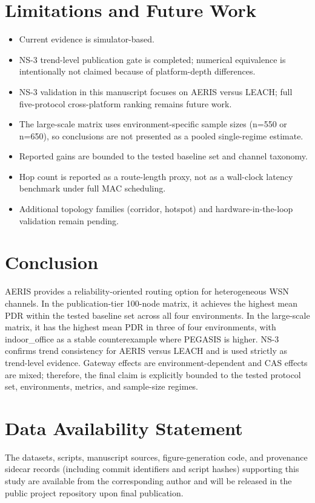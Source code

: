 ﻿\documentclass[sensors,article,submit,moreauthors,pdftex]{Definitions/mdpi}
\begin{document}
\section{Limitations and Future Work}
\begin{itemize}
\item Current evidence is simulator-based.
\item NS-3 trend-level publication gate is completed; numerical equivalence is intentionally not claimed because of platform-depth differences.
\item NS-3 validation in this manuscript focuses on AERIS versus LEACH; full five-protocol cross-platform ranking remains future work.
\item The large-scale matrix uses environment-specific sample sizes (n=550 or n=650), so conclusions are not presented as a pooled single-regime estimate.
\item Reported gains are bounded to the tested baseline set and channel taxonomy.
\item Hop count is reported as a route-length proxy, not as a wall-clock latency benchmark under full MAC scheduling.
\item Additional topology families (corridor, hotspot) and hardware-in-the-loop validation remain pending.
\end{itemize}

\section{Conclusion}
AERIS provides a reliability-oriented routing option for heterogeneous WSN channels. In the publication-tier 100-node matrix, it achieves the highest mean PDR within the tested baseline set across all four environments. In the large-scale matrix, it has the highest mean PDR in three of four environments, with indoor\_office as a stable counterexample where PEGASIS is higher. NS-3 confirms trend consistency for AERIS versus LEACH and is used strictly as trend-level evidence. Gateway effects are environment-dependent and CAS effects are mixed; therefore, the final claim is explicitly bounded to the tested protocol set, environments, metrics, and sample-size regimes.

\section*{Data Availability Statement}
The datasets, scripts, manuscript sources, figure-generation code, and provenance sidecar records (including commit identifiers and script hashes) supporting this study are available from the corresponding author and will be released in the public project repository upon final publication.


\end{document}
